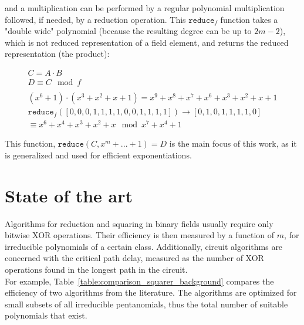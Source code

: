 and a multiplication can be performed by a regular polynomial multiplication followed, if needed, by a reduction operation. This $\texttt{reduce}_f$ function takes a "double wide" polynomial (because the resulting degree can be up to $2m-2$), which is not reduced representation of a field element, and returns the reduced representation (the product):

\begin{gather*}
C = A \cdot B\\
D \equiv C \mod f\\
\\
(x^6+1) \cdot (x^3+x^2+x+1) = x^9 + x^8 + x^7 + x^6 + x^3 + x^2 + x + 1 \\
\texttt{reduce}_f([0, 0, 0, 1, 1, 1, 1, 0, 0, 1, 1, 1, 1]) \rightarrow [0, 1, 0, 1, 1, 1, 1, 0]\\
\equiv x^6 + x^4 + x^3 + x^2 + x \mod x^7+x^4+1
\end{gather*}

This function, $\texttt{reduce}(C, x^m+...+1) = D$ is the main focus of this work, as it is generalized and used for efficient exponentiations.


\section{State of the art} \label{stateoftheart}

Algorithms for reduction and squaring in binary fields usually require only bitwise XOR operations. Their efficiency is then measured by a function of $m$, for irreducible polynomials of a certain class. Additionally, circuit algorithms are concerned with the critical path delay, measured as the number of XOR operations found in the longest path in the circuit. \\

For example, Table~\ref{table:comparison_squarer_background} compares the efficiency of two algorithms from the literature. The algorithms are optimized for small subsets of all irreducible pentanomials, thus the total number of suitable polynomials that exist. \\

